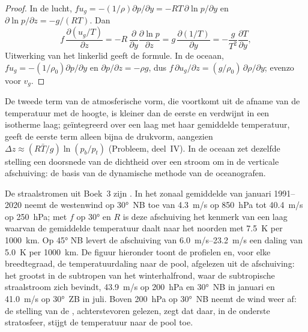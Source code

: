 \begin{proof}
In de lucht, $fu_g = -(1/\rho)\partial p/\partial y = -RT\,\partial\ln
p/\partial y$ en $\partial\ln p/\partial z = -g/(RT)$. Dan
\[
f\,\frac{\partial(u_g/T)}{\partial z} = -R\,\frac{\partial}{\partial y}\frac{\partial\ln p}{\partial z}
= g\,\frac{\partial(1/T)}{\partial y} = -\frac{g}{T^2}\frac{\partial T}{\partial y} ,
\]
Uitwerking van het linkerlid geeft de formule. In de oceaan, $fu_g = -(1/\rho_0)\partial
p/\partial y$ en $\partial p/\partial z = -\rho g$, dus $f\,\partial u_g/
\partial z = (g/\rho_0)\,\partial\rho/\partial y$; evenzo voor $v_g$.
\end{proof}

De tweede term van de atmosferische vorm, die voortkomt uit de afname van de temperatuur
met de hoogte, is kleiner dan de eerste en verdwijnt in een isotherme
laag; geïntegreerd over een laag met haar gemiddelde temperatuur, geeft de eerste term
alleen bijna de drukvorm, aangezien $\Delta z \approx (R\bar T/g)
\ln(p_b/p_t)$ (Probleem, deel~IV). In de oceaan zet dezelfde stelling een
doorsnede van de dichtheid over een stroom om in de verticale afschuiving: de basis van
de dynamische methode van de oceanografen.


De straalstromen uit Boek~3 zijn . In het zonaal gemiddelde
van januari 1991--2020 neemt de westenwind op \ang{30}~NB toe van
\qty{4.3}{m/s} op \qty{850}{hPa} tot \qty{40.4}{m/s} op \qty{250}{hPa}; met
$f$ op \ang{30} en $R$ is deze afschuiving het kenmerk van een laag waarvan de gemiddelde
temperatuur daalt naar het noorden met \qty{7.5}{K} per \qty{1000}{km}. Op \ang{45}
NB levert de afschuiving van \qtyrange{6.0}{23.2}{m/s} een daling van \qty{5.0}{K} per
\qty{1000}{km}. De figuur hieronder toont de profielen en, voor elke breedtegraad,
de temperatuurdaling naar de pool, afgelezen uit de afschuiving: het grootst in de
subtropen van het winterhalfrond, waar de subtropische straalstroom
zich bevindt, \qty{43.9}{m/s} op \qty{200}{hPa} en \ang{30}~NB in januari en
\qty{41.0}{m/s} op \ang{30}~ZB in juli. Boven \qty{200}{hPa} op \ang{30}~NB
neemt de wind weer af: de stelling van de , achterstevoren gelezen, zegt dat
daar, in de onderste stratosfeer, stijgt de temperatuur naar de pool toe.


